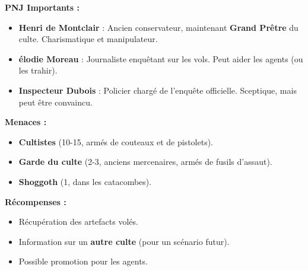 \documentclass[10pt,a5paper,twoside]{book}
\begin{document}
\begin{shaded}
\textbf{PNJ Importants :}
	\begin{itemize}
		\item \textbf{Henri de Montclair} : Ancien conservateur, maintenant \textbf{Grand Prêtre} du culte. Charismatique et manipulateur.
		\item \textbf{élodie Moreau} : Journaliste enquêtant sur les vols. Peut aider les agents (ou les trahir).
		\item \textbf{Inspecteur Dubois} : Policier chargé de l'enquête officielle. Sceptique, mais peut être convaincu.
	\end{itemize}

\textbf{Menaces :}
	\begin{itemize}
		\item \textbf{Cultistes} (10-15, armés de couteaux et de pistolets).
		\item \textbf{Garde du culte} (2-3, anciens mercenaires, armés de fusils d'assaut).
		\item \textbf{Shoggoth} (1, dans les catacombes).
	\end{itemize}

\textbf{Récompenses :}
	\begin{itemize}
		\item Récupération des artefacts volés.
		\item Information sur un \textbf{autre culte} (pour un scénario futur).
		\item Possible promotion pour les agents.
	\end{itemize}
\end{shaded}

\newpage
\end{document}
